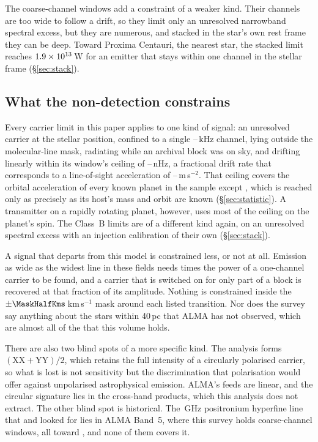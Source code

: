 The \NCoarse{} coarse-channel windows add a constraint of a weaker kind.
Their channels are too wide to follow a drift, so they limit only an
unresolved narrowband spectral excess, but they are numerous, and stacked in
the star's own rest frame they can be deep. Toward Proxima Centauri, the
nearest star, the stacked limit reaches $1.9\times10^{13}$\,W for an
emitter that stays within one channel in the stellar frame
(\S\ref{sec:stack}).

\subsection{What the non-detection constrains}
\label{sec:excludes}

Every carrier limit in this paper applies to one kind of signal: an unresolved
carrier at the stellar position, confined to a single
\ChanLoA--\ChanHiA\,kHz channel, lying outside the molecular-line mask,
radiating while an archival block was on sky, and drifting linearly within
its window's ceiling of \DriftCeilLo--\DriftCeilHi\,nHz, a fractional drift
rate that corresponds to a line-of-sight acceleration of
\AccelCeilMed--\AccelCeilMax\,m\,s$^{-2}$. That ceiling covers
the orbital acceleration of every known planet in the sample except
\AccelWorstName, which is reached only as precisely as its host's mass and
orbit are known (\S\ref{sec:statistic}). A transmitter on a rapidly rotating
planet, however, uses most of the ceiling on the planet's spin. The Class~B
limits are of a different kind again, on an unresolved spectral excess with
an injection calibration of their own (\S\ref{sec:stack}).

A signal that departs from this model is constrained less, or not at all.
Emission as wide as the widest line in these fields needs \ScNBroadRatio{}
times the power of a one-channel carrier to be found, and a carrier that is
switched on for only part of a block is recovered at that fraction of its
amplitude. Nothing is constrained inside the $\pm\MaskHalfKms$\,km\,s$^{-1}$
mask around each listed transition. Nor does the survey say anything about
the stars within 40\,pc that ALMA has not observed, which are almost all of
the \NGaiaCensus{} that this volume holds.

There are also two blind spots of a more specific kind. The analysis forms
$(\mathrm{XX}+\mathrm{YY})/2$, which retains the full intensity of a
circularly polarised carrier, so what is lost is not sensitivity but the
discrimination that polarisation would offer against unpolarised
astrophysical emission. ALMA's feeds are linear, and the circular signature
lies in the cross-hand products, which this analysis does not extract. The
other blind spot is historical. The \SbPriorFreqGHz\,GHz positronium
hyperfine line that \citet{Steffes1994} and \citet{Mauersberger1996} looked
for lies in ALMA Band~5, where this survey holds \LnBFiveWin{} coarse-channel
windows, all toward \LnBFiveStars, and none of them covers it.

